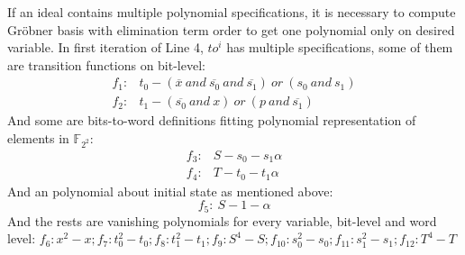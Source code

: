\documentclass{acm_proc_article-sp}
\begin{document}
If an ideal contains multiple polynomial specifications, it is necessary to compute Gr\"obner basis with elimination term
order to get one polynomial only on desired variable. In first iteration of Line 4, $to^i$ has multiple specifications,
some of them are transition functions on bit-level:
\begin{displaymath}
\begin{array}{ll}
f_1:& t_0 - (\overline{x}\ and\ \overline{s_0}\ and\ \overline{s_1})\ or\ (s_0\ and\ s_1) \\
f_2:& t_1 - (\overline{s_0}\ and\ x)\ or\ (p\ and\ \overline{s_1})\
\end{array}
\end{displaymath}
And some are bits-to-word definitions fitting polynomial representation of elements in $\mathbb{F}_{2^2}$:
\begin{displaymath}
\begin{array}{ll}
f_3:& S - s_0 - s_1\alpha \\
f_4:& T - t_0 - t_1\alpha
\end{array}
\end{displaymath}
And an polynomial about initial state as mentioned above:
\begin{displaymath}
f_5:\  S - 1 - \alpha
\end{displaymath}
And the rests are vanishing polynomials for every variable, bit-level and word level:
$f_6: x^2 - x; f_7: t_0^2 - t_0; f_8: t_1^2 - t_1; f_9: S^4 - S; f_{10}: s_0^2 - s_0;
f_{11}: s_1^2 - s_1; f_{12}: T^4 - T$
\end{document}

